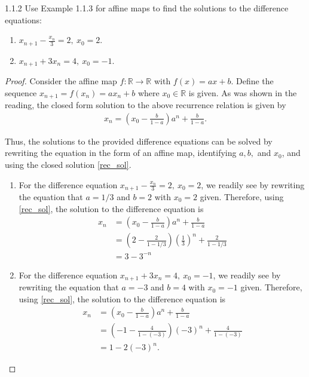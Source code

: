 \begin{problem}{1.1.2}
  Use Example 1.1.3 for affine maps to find the solutions to the difference equations:
  \begin{enumerate}
    \item $x_{n+1} - \frac{x_n}{3} = 2,\ x_0 = 2$.
    \item $x_{n+1} + 3x_n = 4,\ x_0 = -1$.
  \end{enumerate}
\end{problem}

\begin{proof}
  Consider the affine map $f: \mathbb{R} \to \mathbb{R}$ with $f(x) = ax + b$. Define
  the sequence $x_{n+1} = f(x_n) = ax_n + b$ where $x_0 \in \mathbb{R}$ is given.
  As was shown in the reading, the closed form solution to the above recurrence
  relation is given by
  \begin{align}\label{rec_sol}
    x_n = \left(x_0 - \frac{b}{1 - a}\right) a^n + \frac{b}{1 - a}.
  \end{align}

  Thus, the solutions to the provided difference equations can be solved by
  rewriting the equation in the form of an affine map, identifying $a, b,$ and $x_0$, and using the closed solution \eqref{rec_sol}.
  \begin{enumerate}
    \item For the difference equation $x_{n+1} - \frac{x_n}{3} = 2,\ x_0 = 2$,
      we readily see by rewriting the equation that $a = 1/3$ and $b=2$ with
      $x_0 = 2$ given. Therefore, using \eqref{rec_sol}, the solution to the difference
      equation is
      \begin{align*}
        x_n &= \left(x_0 - \frac{b}{1 - a}\right) a^n + \frac{b}{1 - a} \\
        &= \left(2 - \frac{2}{1 - 1/3}\right) \left(\frac{1}{3}\right)^n + \frac{2}{1 - 1/3} \\
        &= 3-3^{-n}
      \end{align*}
    \item For the difference equation  $x_{n+1} + 3x_n = 4,\ x_0 = -1$,
      we readily see by rewriting the equation that $a = -3$ and $b=4$ with
      $x_0 = -1$ given. Therefore, using \eqref{rec_sol}, the solution to the difference
      equation is
      \begin{align*}
        x_n &= \left(x_0 - \frac{b}{1 - a}\right) a^n + \frac{b}{1 - a} \\
        &= \left(-1 - \frac{4}{1 - (-3)}\right) \left(-3\right)^n + \frac{4}{1 - (-3)} \\
        &= 1 - 2 (-3)^n.
      \end{align*}
  \end{enumerate}


\end{proof}
\newpage
